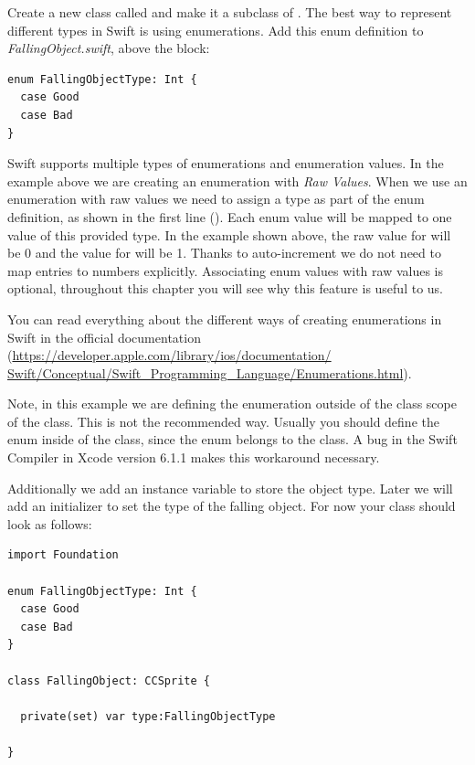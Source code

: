 Create a new class called  and make it a subclass
of \ccsprite{}. The best way to represent different types in Swift is
using enumerations. Add this enum definition to \textit{FallingObject.swift},
above the  block:

\begin{lstlisting}
enum FallingObjectType: Int {
  case Good
  case Bad
}
\end{lstlisting}

Swift supports multiple types of enumerations and enumeration values.
In the example above we are creating an enumeration with \textit{Raw Values}.
When we use an enumeration with raw values we need to assign a type as part of
the enum definition, as shown in the first line (). Each enum value will be mapped to one value of this
provided type. In the example shown above, the raw value for
 will be 0 and the value for
 will be 1. Thanks to auto-increment we do not
need to map entries to numbers explicitly. Associating enum values with raw values is optional,
throughout this chapter you will see why this feature is useful to us.

\begin{details}[frametitle={Enumerations in Swift}] 
You can read everything about the different ways of creating enumerations in
Swift in the official documentation
(\url{https://developer.apple.com/library/ios/documentation/
Swift/Conceptual/Swift_Programming_Language/Enumerations.html}).

Note, in this example we are defining the enumeration outside of the class scope
of the  class. This is not the recommended way.
Usually you should define the enum inside of the class, since the enum belongs
to the class. A bug in the Swift Compiler in Xcode version 6.1.1 makes this
workaround necessary.
\end{details}

Additionally we add an instance variable to store the object type. Later we will
add an initializer to set the type of the falling object. For now your class
should look as follows:

\begin{lstlisting}
import Foundation

enum FallingObjectType: Int {
  case Good
  case Bad
}

class FallingObject: CCSprite {
    
  private(set) var type:FallingObjectType
  
}
\end{lstlisting}

